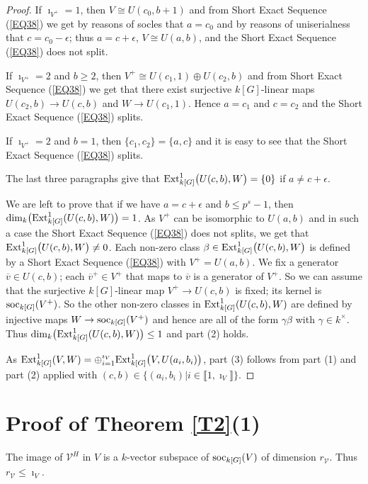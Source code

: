\documentclass[11pt]{amsart}
\def\soc{\textup{soc}}
\def\Ext{\textup{Ext}}
\begin{document}
\begin{proof}
If $\imath_{V^+}=1$, then $V\cong U(c_0,b+1)$ and from Short Exact Sequence (\ref{EQ38}) we get by reasons of socles that $a=c_0$ and by reasons of uniserialness that $c=c_0-\epsilon$; thus $a=c+\epsilon$, $V\cong U(a,b)$, and the Short Exact Sequence (\ref{EQ38}) does not split. 

If $\imath_{V^+}=2$ and $b\ge 2$, then $V^+\cong U(c_1,1)\oplus U(c_2,b)$ and from Short Exact Sequence (\ref{EQ38}) we get that there exist surjective $k[G]$-linear maps $U(c_2,b)\rightarrow U(c,b)$ and $W\rightarrow U(c_1,1)$. Hence $a=c_1$ and $c=c_2$ and the Short Exact Sequence (\ref{EQ38}) splits.

If $\imath_{V^+}=2$ and $b=1$, then $\{c_1,c_2\}=\{a,c\}$ and it is easy to see that the Short Exact Sequence (\ref{EQ38}) splits.

The last three paragraphs give that $\Ext^1_{k[G]}\bigl(U(c,b),W\bigr)=\{0\}$ if $a\neq c+\epsilon$. 

We are left to prove that if we have $a=c+\epsilon$ and $b\le p^s-1$, then $\dim_k\bigl(\Ext^1_{k[G]}(U(c,b),W)\bigr)=1$. As $V^+$ can be isomorphic to $U(a,b)$ and in such a case the Short Exact Sequence (\ref{EQ38}) does not splits, we get that $\Ext^1_{k[G]}\bigl(U(c,b),W\bigr)\neq 0$. Each non-zero class $\beta\in\Ext^1_{k[G]}\bigl(U(c,b),W\bigr)$ is defined by a Short Exact Sequence (\ref{EQ38}) with $V^+=U(a,b)$. We fix a generator $\overline{v}\in U(c,b)$; each $\overline{v}^+\in V^+$ that maps to $\overline{v}$ is a generator of $V^+$. So we can assume that the surjective $k[G]$-linear map $V^+\rightarrow U(c,b)$ is fixed; its kernel is $\soc_{k[G]}(V^+)$. So the other non-zero classes in $\Ext^1_{k[G]}(U(c,b),W)$ are defined by injective maps $W\rightarrow \soc_{k[G]}(V^+)$ and hence are all of the form $\gamma\beta$ with $\gamma\in k^{\times}$. Thus $\dim_k\bigl(\Ext^1_{k[G]}(U(c,b),W)\bigr)\le 1$ and part (2) holds.

As $\Ext^1_{k[G]}(V,W)=\oplus_{i=1}^{\imath_V} \Ext^1_{k[G]}\bigl(V,U(a_i,b_i)\bigr)$, part (3) follows from part (1) and part (2) applied with $(c,b)\in\{(a_i,b_i)|i\in\llbracket1,\imath_V\rrbracket\}$.
\end{proof}

\section{Proof of Theorem \ref{T2}(1)}\label{S6}

The image of $\mathcal V^H$ in $V$ is a $k$-vector subspace of $\soc_{k[G]}(V)$ of dimension $r_{\mathcal V}$. Thus $r_{\mathcal V}\le \imath_V$. 
\end{document}
